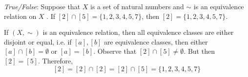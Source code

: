 \documentclass[11pt,letterpaper]{article}
\begin{document}
\quizsol \textit{True/False}: Suppose that $X$ is a set of natural numbers and $\sim$ is an equivalence relation on $X$ . If $[2] \cap [5]= \{ 1, 2, 3, 4, 5, 7 \}$, then $[2]= \{ 1, 2, 3, 4, 5, 7 \}$. \pspace

\sol If $(X, \sim)$ is an equivalence relation, then all equivalence classes are either disjoint or equal, i.e. if $[a], [b]$ are equivalence classes, then either $[a] \cap [b]= \emptyset$ or $[a]= [b]$. Observe that $[2] \cap [5] \neq \emptyset$. But then $[2]= [5]$. Therefore, 
	\[
	[2]= [2] \cap [2]= [2] \cap [5]= \{ 1, 2, 3, 4, 5, 7 \}
	\] \pvspace{1.5cm}


% 
\end{document}
